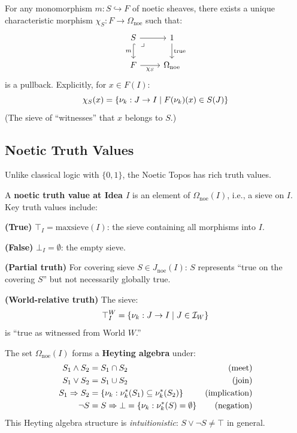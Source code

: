 \begin{theorem}
\label{thm:omega-universal}
For any monomorphism $m : S \hookrightarrow F$ of noetic sheaves, there exists
a unique characteristic morphism $\chi_S : F \to \Omega_{\mathrm{noe}}$ such that:
\[
\begin{tikzcd}
  S \arrow[r] \arrow[d, hook, "m"'] \arrow[dr, phantom, "\lrcorner", very near start]
  & 1 \arrow[d, "\mathrm{true}"] \\
  F \arrow[r, "\chi_S"']
  & \Omega_{\mathrm{noe}}
\end{tikzcd}
\]
is a pullback. Explicitly, for $x \in F(I)$:
\[
  \chi_S(x) = \{\nu_{k} : J \to I \mid F(\nu_{k})(x) \in S(J)\}
\]
(The sieve of ``witnesses'' that $x$ belongs to $S$.)
\end{theorem}

\subsection{Noetic Truth Values}
\label{subsec:noetic-truth-values}

Unlike classical logic with $\{0, 1\}$, the Noetic Topos has rich truth values.

\begin{definition}
\label{def:noetic-truth-values}
A \textbf{noetic truth value at Idea $I$} is an element of $\Omega_{\mathrm{noe}}(I)$,
i.e., a sieve on $I$. Key truth values include:

\textbf{(True)} $\top_I = \mathrm{maxsieve}(I)$: the sieve containing all morphisms into $I$.

\textbf{(False)} $\bot_I = \emptyset$: the empty sieve.

\textbf{(Partial truth)} For covering sieve $S \in J_{\mathrm{noe}}(I)$:
$S$ represents ``true on the covering $S$'' but not necessarily globally true.

\textbf{(World-relative truth)} The sieve:
\[
  \top^W_I = \{\nu_{k} : J \to I \mid J \in \mathcal{I}_W\}
\]
is ``true as witnessed from World $W$.''
\end{definition}

\begin{proposition}
\label{prop:truth-graded}
The set $\Omega_{\mathrm{noe}}(I)$ forms a \textbf{Heyting algebra} under:
\begin{align*}
  S_1 \land S_2 &= S_1 \cap S_2 & \text{(meet)} \\
  S_1 \lor S_2 &= S_1 \cup S_2 & \text{(join)} \\
  S_1 \Rightarrow S_2 &= \{\nu_{k} : \nu_{k}^*(S_1) \subseteq \nu_{k}^*(S_2)\} & \text{(implication)} \\
  \neg S &= S \Rightarrow \bot = \{\nu_{k} : \nu_{k}^*(S) = \emptyset\} & \text{(negation)}
\end{align*}
This Heyting algebra structure is \emph{intuitionistic}: $S \lor \neg S \neq \top$
in general.
\end{proposition}

